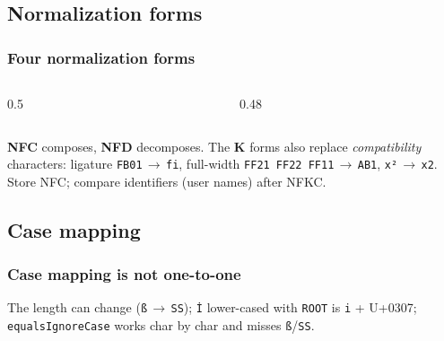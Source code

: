 \documentclass[aspectratio=169,10pt,compress]{beamer}
\begin{document}
\subsection[Normalization]{Normalization forms}




\begin{frame}[t,fragile] \frametitle{Four normalization forms}
  \begin{columns}[T]
    \begin{column}{0.5\textwidth}
    \end{column}
    \begin{column}{0.48\textwidth}
    \end{column}
  \end{columns}

  \vspace{0.1em}
  \small \textbf{NFC} composes, \textbf{NFD} decomposes. The \textbf{K} forms also replace
  \emph{compatibility} characters: ligature \texttt{FB01}\,$\to$\,\texttt{fi}, full-width \texttt{FF21 FF22 FF11}\,$\to$\,\texttt{AB1},
  \texttt{x²}\,$\to$\,\texttt{x2}. Store NFC; compare identifiers (user names) after NFKC.
\end{frame}

\subsection[Case]{Case mapping}




\begin{frame}[t,fragile] \frametitle{Case mapping is not one-to-one}

  \vspace{0.1em}
  \small
  The length can change (\texttt{ß}\,$\to$\,\texttt{SS}); \texttt{İ} lower-cased with \texttt{ROOT} is \texttt{i} + U+0307;
  \texttt{equalsIgnoreCase} works char by char and misses \texttt{ß}/\texttt{SS}.
\end{frame}
\end{document}
